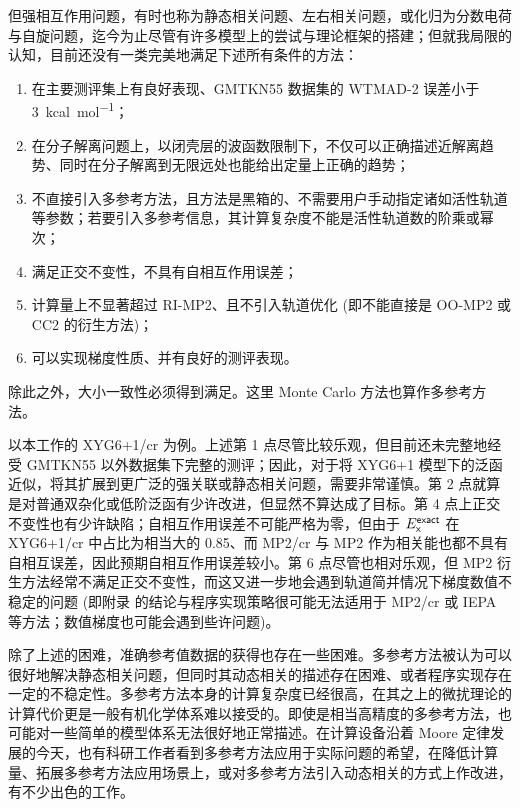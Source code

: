 但强相互作用问题，有时也称为静态相关问题\cite{Cremer-Cremer.MP.2001}、左右相关问题\cite{Handy-Cohen.MP.2001, Cohen-Handy.MP.2001}，或化归为分数电荷与自旋问题\cite{Cohen-Yang.S.2008, Cohen-Yang.JCP.2008, Mori-Sanchez-Yang.PRL.2009}，迄今为止尽管有许多模型上的尝试与理论框架的搭建\cite{Hesselmann-Goerling.PRL.2011, Lan-Yanai.JCP.2013, Mezei-Kallay.JCTC.2015, Zhang-Scheffler.NJP.2016, Goerling-Goerling.PRB.2019, Shee-Head-Gordon.JPCL.2021, Zhang-Xu.JPCL.2021, Kirkpatrick-Cohen.S.2021, Santra-Martin.JPCL.2022}；但就我局限的认知，目前还没有一类完美地满足下述所有条件的方法：
\begin{enumerate}[nosep]
    \item 在主要测评集上有良好表现、GMTKN55 数据集的 WTMAD-2 误差小于 \SI{3}{kcal.mol^{-1}}；
    \item 在分子解离问题上，以闭壳层的波函数限制下，不仅可以正确描述近解离趋势、同时在分子解离到无限远处也能给出定量上正确的趋势；
    \item 不直接引入多参考方法，且方法是黑箱的、不需要用户手动指定诸如活性轨道等参数；若要引入多参考信息，其计算复杂度不能是活性轨道数的阶乘或幂次；
    \item 满足正交不变性，不具有自相互作用误差；
    \item 计算量上不显著超过 RI-MP2、且不引入轨道优化 (即不能直接是 OO-MP2 或 CC2 的衍生方法)；
    \item 可以实现梯度性质、并有良好的测评表现。
\end{enumerate}
除此之外，大小一致性必须得到满足。这里 Monte Carlo 方法也算作多参考方法。

以本工作的 XYG6+1/cr 为例。上述第 1 点尽管比较乐观，但目前还未完整地经受 GMTKN55 以外数据集下完整的测评；因此，对于将 XYG6+1 模型下的泛函近似，将其扩展到更广泛的强关联或静态相关问题，需要非常谨慎。第 2 点就算是对普通双杂化或低阶泛函有少许改进，但显然不算达成了目标。第 4 点上正交不变性也有少许缺陷；自相互作用误差不可能严格为零，但由于 $E_{\textsf{x}}^{\textsf{exact}}$ 在 XYG6+1/cr 中占比为相当大的 0.85、而 MP2/cr 与 MP2 作为相关能也都不具有自相互误差，因此预期自相互作用误差较小。第 6 点尽管也相对乐观，但 MP2 衍生方法经常不满足正交不变性，而这又进一步地会遇到轨道简并情况下梯度数值不稳定的问题 (即附录  的结论与程序实现策略很可能无法适用于 MP2/cr 或 IEPA 等方法；数值梯度也可能会遇到些许问题)。

除了上述的困难，准确参考值数据的获得也存在一些困难。多参考方法被认为可以很好地解决静态相关问题，但同时其动态相关的描述存在困难、或者程序实现存在一定的不稳定性。多参考方法本身的计算复杂度已经很高，在其之上的微扰理论的计算代价更是一般有机化学体系难以接受的\cite{Finley-Serrano-Andres.CPL.1998, Angeli-Malrieu.JCP.2001, Angeli-Malrieu.CPL.2001, Malmqvist-Gagliardi.JCP.2008, Pulay-Pulay.IJQC.2011}。即使是相当高精度的多参考方法，也可能对一些简单的模型体系无法很好地正常描述\cite{Vancoillie-Veryazov.JCTC.2016}。在计算设备沿着 Moore 定律发展的今天，也有科研工作者看到多参考方法应用于实际问题的希望，在降低计算量、拓展多参考方法应用场景上\cite{Ren-Shuai.WCMS.2022, Li-Chen.PRR.2022, Xiang-Li.JCTC.2024}，或对多参考方法引入动态相关的方式上作改进\cite{Mitra-Gagliardi.JCTC.2023, Feng-Xu.chemRxiv.2023}，有不少出色的工作。


